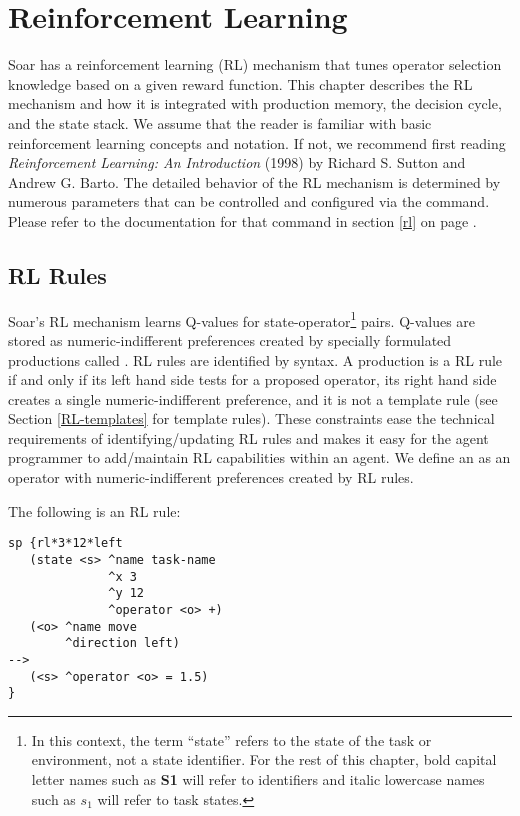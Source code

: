 \chapter{Reinforcement Learning}
\label{RL}

Soar has a reinforcement learning (RL) mechanism that tunes operator selection knowledge based on a given reward function.
This chapter describes the RL mechanism and how it is integrated with production memory, the decision cycle, and the state stack.
We assume that the reader is familiar with basic reinforcement learning concepts and notation. If not, we recommend first reading \emph{Reinforcement Learning: An Introduction} (1998) by Richard S. Sutton and Andrew G. Barto.
The detailed behavior of the RL mechanism is determined by numerous parameters that can be controlled and configured via the  command.
Please refer to the documentation for that command in section \ref{rl} on page \pageref{rl}.

\section{RL Rules}
\label{RL-rules}

Soar's RL mechanism learns Q-values for state-operator\footnote{
	In this context, the term ``state'' refers to the state of the task or environment, not a state identifier.
	For the rest of this chapter, bold capital letter names such as \textbf{S1} will refer to identifiers and italic lowercase names such as $s_1$ will refer to task states.}
pairs.
Q-values are stored as numeric-indifferent preferences created by specially formulated productions called .
RL rules are identified by syntax.
A production is a RL rule if and only if its left hand side tests for a proposed operator, its right hand side creates a single numeric-indifferent preference, and it is not a template rule (see Section \ref{RL-templates} for template rules).
These constraints ease the technical requirements of identifying/updating RL rules and makes it easy for the agent programmer to add/maintain RL capabilities within an agent.
We define an  as an operator with numeric-indifferent preferences created by RL rules.

The following is an RL rule:

\begin{verbatim}
sp {rl*3*12*left
   (state <s> ^name task-name
              ^x 3
              ^y 12
              ^operator <o> +)
   (<o> ^name move
	    ^direction left)
-->
   (<s> ^operator <o> = 1.5)
}
\end{verbatim}

